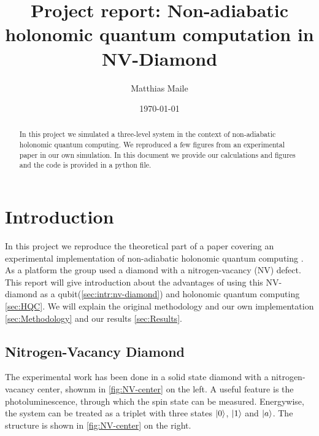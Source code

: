 \documentclass[%
reprint,
amsmath,amssymb,
aps,
]{revtex4-2}
\begin{document}
\title{Project report: Non-adiabatic holonomic quantum computation in NV-Diamond}%

\author{Matthias Maile}

\date{\today}%

\begin{abstract}
  In this project we simulated a three-level system in the context of non-adiabatic holonomic quantum
  computing. We reproduced a few figures from an experimental paper in our own simulation. In this
  document we provide our calculations and figures and the code is provided in a python file.
\end{abstract}

\maketitle

\tableofcontents

\section{Introduction}
\label{sec:Introduction}
In this project we reproduce the theoretical part of a paper covering an experimental
implementation of non-adiabatic holonomic quantum computing \cite{PhysRevApplied.16.024060}. 
As a platform the group used a diamond with a nitrogen-vacancy (NV) defect. This report will give 
introduction about the advantages of using this NV-diamond as a qubit(\autoref{sec:intr:nv-diamond})
and holonomic quantum computing \autoref{sec:HQC}. We will explain the original methodology and our
own implementation \autoref{sec:Methodology} and our results \autoref{sec:Results}.

\subsection{Nitrogen-Vacancy Diamond}
\label{sec:intr:nv-diamond}
The experimental work has been done in a solid state diamond with a nitrogen-vacancy center, shownm
in \autoref{fig:NV-center} on the left. A useful feature is the photoluminescence, through which the
spin state can be measured. Energywise, the system can be treated as a triplet with three states
$\ket{0}$, $\ket{1}$ and $\ket{a}$. The structure is shown in \autoref{fig:NV-center} on the right.
\end{document}
